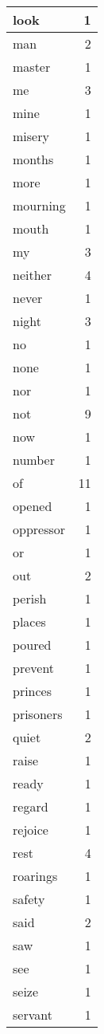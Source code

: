 \begin{center}
\begin{longtable}{l|r}
look & 1\\ \hline 
man & 2\\ \hline 
master & 1\\ \hline 
me & 3\\ \hline 
mine & 1\\ \hline 
misery & 1\\ \hline 
months & 1\\ \hline 
more & 1\\ \hline 
mourning & 1\\ \hline 
mouth & 1\\ \hline 
my & 3\\ \hline 
neither & 4\\ \hline 
never & 1\\ \hline 
night & 3\\ \hline 
no & 1\\ \hline 
none & 1\\ \hline 
nor & 1\\ \hline 
not & 9\\ \hline 
now & 1\\ \hline 
number & 1\\ \hline 
of & 11\\ \hline 
opened & 1\\ \hline 
oppressor & 1\\ \hline 
or & 1\\ \hline 
out & 2\\ \hline 
perish & 1\\ \hline 
places & 1\\ \hline 
poured & 1\\ \hline 
prevent & 1\\ \hline 
princes & 1\\ \hline 
prisoners & 1\\ \hline 
quiet & 2\\ \hline 
raise & 1\\ \hline 
ready & 1\\ \hline 
regard & 1\\ \hline 
rejoice & 1\\ \hline 
rest & 4\\ \hline 
roarings & 1\\ \hline 
safety & 1\\ \hline 
said & 2\\ \hline 
saw & 1\\ \hline 
see & 1\\ \hline 
seize & 1\\ \hline 
servant & 1\\ \hline 

\end{longtable}
\end{center}
